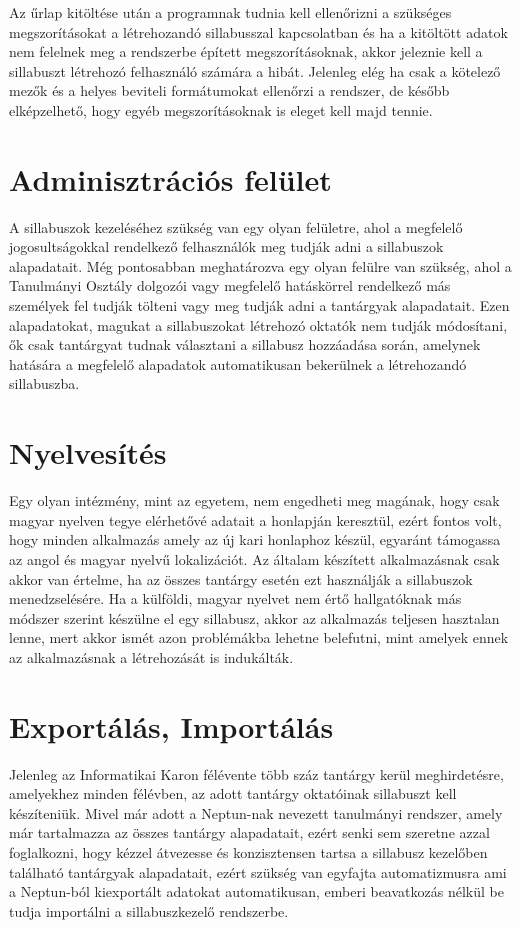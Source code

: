 \documentclass[hidelinks, 12pt, a4paper]{report}
\begin{document}
Az űrlap kitöltése után a programnak tudnia kell ellenőrizni a szükséges megszorításokat a létrehozandó sillabusszal kapcsolatban és ha a kitöltött adatok nem felelnek meg a rendszerbe épített megszorításoknak, akkor jeleznie kell a sillabuszt létrehozó felhasználó számára a hibát. Jelenleg elég ha csak a kötelező mezők és a helyes beviteli formátumokat ellenőrzi a rendszer, de később elképzelhető, hogy egyéb megszorításoknak is eleget kell majd tennie.

\section{Adminisztrációs felület}

A sillabuszok kezeléséhez szükség van egy olyan felületre, ahol a megfelelő jogosultságokkal rendelkező felhasználók meg tudják adni a sillabuszok alapadatait. Még pontosabban meghatározva egy olyan felülre van szükség, ahol a Tanulmányi Osztály dolgozói vagy megfelelő hatáskörrel rendelkező más személyek fel tudják tölteni vagy meg tudják adni a tantárgyak alapadatait. Ezen alapadatokat, magukat a sillabuszokat létrehozó oktatók nem tudják módosítani, ők csak tantárgyat tudnak választani a sillabusz hozzáadása során, amelynek hatására a megfelelő alapadatok automatikusan bekerülnek a létrehozandó sillabuszba.

\section{Nyelvesítés}

Egy olyan intézmény, mint az egyetem, nem engedheti meg magának, hogy csak magyar nyelven tegye elérhetővé adatait a honlapján keresztül, ezért fontos volt, hogy minden alkalmazás amely az új kari honlaphoz készül, egyaránt támogassa az angol és magyar nyelvű lokalizációt. Az általam készített alkalmazásnak csak akkor van értelme, ha az összes tantárgy esetén ezt használják a sillabuszok menedzselésére. Ha a külföldi, magyar nyelvet nem értő hallgatóknak más módszer szerint készülne el egy sillabusz, akkor az alkalmazás teljesen hasztalan lenne, mert akkor ismét azon problémákba lehetne belefutni, mint amelyek ennek az alkalmazásnak a létrehozását is indukálták.

\section{Exportálás, Importálás}

Jelenleg az Informatikai Karon félévente több száz tantárgy kerül meghirdetésre, amelyekhez minden félévben, az adott tantárgy oktatóinak sillabuszt kell készíteniük. Mivel már adott a Neptun-nak nevezett tanulmányi rendszer, amely már tartalmazza az összes tantárgy alapadatait, ezért senki sem szeretne azzal foglalkozni, hogy kézzel átvezesse és konzisztensen tartsa a sillabusz kezelőben található tantárgyak alapadatait, ezért szükség van egyfajta automatizmusra ami a Neptun-ból kiexportált adatokat automatikusan, emberi beavatkozás nélkül be tudja importálni a sillabuszkezelő rendszerbe.
\end{document}
